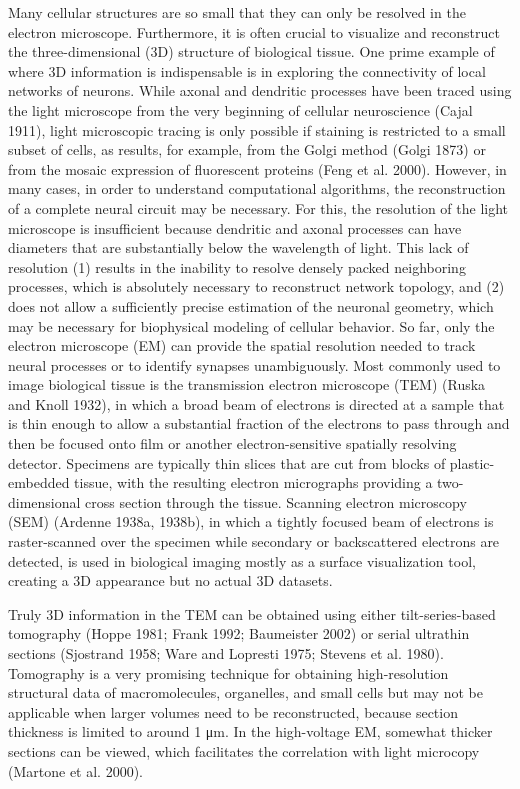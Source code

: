 \documentclass{article}
\begin{document}
Many cellular structures are so small that they can only be resolved in the electron microscope. Furthermore, it is often crucial to visualize and reconstruct the three-dimensional (3D) structure of biological tissue. One prime example of where 3D information is indispensable is in exploring the connectivity of local networks of neurons. While axonal and dendritic processes have been traced using the light microscope from the very beginning of cellular neuroscience (Cajal 1911), light microscopic tracing is only possible if staining is restricted to a small subset of cells, as results, for example, from the Golgi method (Golgi 1873) or from the mosaic expression of fluorescent proteins (Feng et al. 2000). However, in many cases, in order to understand computational algorithms, the reconstruction of a complete neural circuit may be necessary. For this, the resolution of the light microscope is insufficient because dendritic and axonal processes can have diameters that are substantially below the wavelength of light. This lack of resolution (1) results in the inability to resolve densely packed neighboring processes, which is absolutely necessary to reconstruct network topology, and (2) does not allow a sufficiently precise estimation of the neuronal geometry, which may be necessary for biophysical modeling of cellular behavior. So far, only the electron microscope (EM) can provide the spatial resolution needed to track neural processes or to identify synapses unambiguously. Most commonly used to image biological tissue is the transmission electron microscope (TEM) (Ruska and Knoll 1932), in which a broad beam of electrons is directed at a sample that is thin enough to allow a substantial fraction of the electrons to pass through and then be focused onto film or another electron-sensitive spatially resolving detector. Specimens are typically thin slices that are cut from blocks of plastic-embedded tissue, with the resulting electron micrographs providing a two-dimensional cross section through the tissue. Scanning electron microscopy (SEM) (Ardenne 1938a, 1938b), in which a tightly focused beam of electrons is raster-scanned over the specimen while secondary or backscattered electrons are detected, is used in biological imaging mostly as a surface visualization tool, creating a 3D appearance but no actual 3D datasets.

Truly 3D information in the TEM can be obtained using either tilt-series-based tomography (Hoppe 1981; Frank 1992; Baumeister 2002) or serial ultrathin sections (Sjostrand 1958; Ware and Lopresti 1975; Stevens et al. 1980). Tomography is a very promising technique for obtaining high-resolution structural data of macromolecules, organelles, and small cells but may not be applicable when larger volumes need to be reconstructed, because section thickness is limited to around 1 μm. In the high-voltage EM, somewhat thicker sections can be viewed, which facilitates the correlation with light microcopy (Martone et al. 2000).
\end{document}

